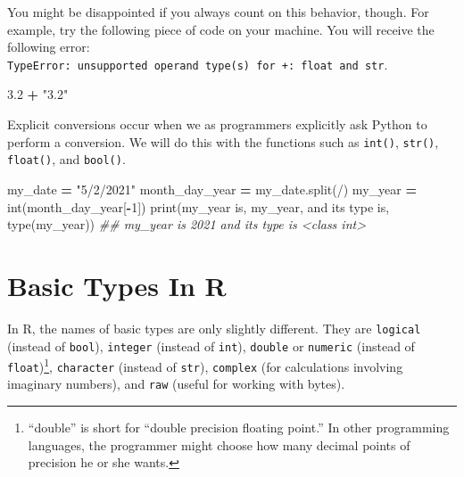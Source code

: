 \documentclass[
  12pt,
  krantz2]{krantz}
\makeatletter
\newenvironment{Shaded}{\begin{snugshade}}{\end{snugshade}}
\newcommand{\BuiltInTok}[1]{#1}
\newcommand{\CommentTok}[1]{\textcolor[rgb]{0.37,0.37,0.37}{\textit{#1}}}
\newcommand{\DecValTok}[1]{\textcolor[rgb]{0.06,0.06,0.06}{#1}}
\newcommand{\FloatTok}[1]{\textcolor[rgb]{0.06,0.06,0.06}{#1}}
\newcommand{\NormalTok}[1]{#1}
\newcommand{\OperatorTok}[1]{\textcolor[rgb]{0.43,0.43,0.43}{\textbf{#1}}}
\newcommand{\StringTok}[1]{\textcolor[rgb]{0.5,0.5,0.5}{#1}}
\newenvironment{kframe}{%
\medskip{}
\setlength{\fboxsep}{.8em}
 \def\at@end@of@kframe{}%
 \ifinner\ifhmode%
  \def\at@end@of@kframe{\end{minipage}}%
  \begin{minipage}{\columnwidth}%
 \fi\fi%
 \def\FrameCommand##1{\hskip\@totalleftmargin \hskip-\fboxsep
 \colorbox{shadecolor}{##1}\hskip-\fboxsep
     \hskip-\linewidth \hskip-\@totalleftmargin \hskip\columnwidth}%
 \MakeFramed {\advance\hsize-\width
   \@totalleftmargin\z@ \linewidth\hsize
   \@setminipage}}%
 {\par\unskip\endMakeFramed%
 \at@end@of@kframe}
\renewenvironment{Shaded}{\begin{kframe}}{\end{kframe}}
\makeatother
\begin{document}
You might be disappointed if you always count on this behavior, though. For example, try the following piece of code on your machine. You will receive the following error: \texttt{TypeError:\ unsupported\ operand\ type(s)\ for\ +:\ \textquotesingle{}float\textquotesingle{}\ and\ \textquotesingle{}str\textquotesingle{}}.

\begin{Shaded}
\begin{Highlighting}[]
\FloatTok{3.2} \OperatorTok{+} \StringTok{"3.2"}
\end{Highlighting}
\end{Shaded}

Explicit conversions occur when we as programmers explicitly ask Python to perform a conversion. We will do this with the functions such as \texttt{int()}, \texttt{str()}, \texttt{float()}, and \texttt{bool()}.

\begin{Shaded}
\begin{Highlighting}[]
\NormalTok{my\_date }\OperatorTok{=} \StringTok{"5/2/2021"}
\NormalTok{month\_day\_year }\OperatorTok{=}\NormalTok{ my\_date.split(}\StringTok{\textquotesingle{}/\textquotesingle{}}\NormalTok{)}
\NormalTok{my\_year }\OperatorTok{=} \BuiltInTok{int}\NormalTok{(month\_day\_year[}\OperatorTok{{-}}\DecValTok{1}\NormalTok{]) }
\BuiltInTok{print}\NormalTok{(}\StringTok{\textquotesingle{}my\_year is\textquotesingle{}}\NormalTok{, my\_year, }\StringTok{\textquotesingle{}and its type is\textquotesingle{}}\NormalTok{, }\BuiltInTok{type}\NormalTok{(my\_year))}
\CommentTok{\#\# my\_year is 2021 and its type is \textless{}class \textquotesingle{}int\textquotesingle{}\textgreater{}}
\end{Highlighting}
\end{Shaded}

\hypertarget{basic-types-in-r}{%
\section{Basic Types In R}\label{basic-types-in-r}}

In R, the names of basic types are only slightly different. They are \texttt{logical} (instead of \texttt{bool}), \texttt{integer} (instead of \texttt{int}), \texttt{double} or \texttt{numeric} (instead of \texttt{float})\footnote{``double'' is short for ``double precision floating point.'' In other programming languages, the programmer might choose how many decimal points of precision he or she wants.}, \texttt{character} (instead of \texttt{str}), \texttt{complex} (for calculations involving imaginary numbers), and \texttt{raw} (useful for working with bytes).
\end{document}
